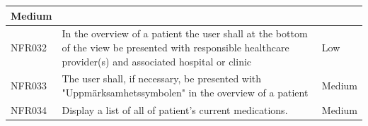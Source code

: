 \documentclass{scrreprt}
\begin{document}
\begin{center}
\begin{tabularx}{\linewidth}{| l | X | l |}
Medium \\ 
\hline
NFR032 & 
In the overview of a patient the user shall at the bottom of the view be presented with responsible healthcare provider(s) and associated hospital or clinic &
Low \\ 
\hline
NFR033 & 
The user shall, if necessary, be presented with "Uppmärksamhetssymbolen" in the overview of a patient &
Medium \\ 
\hline
NFR034 & 
Display a list of all of patient's current medications.  &
Medium \\ 
\hline
\end{tabularx}
\end{center}



\end{document}
